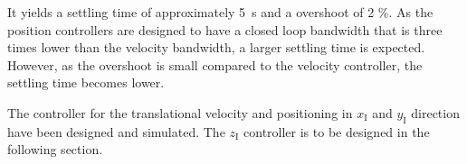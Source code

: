 \begin{minipage}{\linewidth}
\begin{minipage}{0.46\linewidth}
\begin{figure}[H]
            \centering
            \label{fig:positionControllersXYAction}
        \end{figure}
    \end{minipage}
\end{minipage}

 It yields a settling time of approximately \SI{5}{s} and a overshoot of 2 \%. As the position controllers are designed to have a closed loop bandwidth that is three times lower than the velocity bandwidth, a larger settling time is expected. However, as the overshoot is small compared to the velocity controller, the settling time becomes lower.%

The controller for the translational velocity and positioning in $x_{\mathrm{I}}$ and $y_{\mathrm{I}}$ direction have been designed and simulated. The $z_{\mathrm{I}}$ controller is to be designed in the following section.
